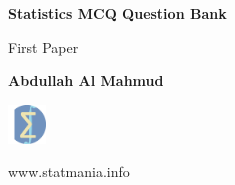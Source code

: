 \documentclass{exam}
\begin{document}
\begin{titlepage}
    \begin{center}
        \vspace*{1cm}
            
        \Huge
        \textbf{Statistics MCQ Question Bank}
            
        \vspace{0.5cm}
        \LARGE
        First Paper \\

            
        \vspace{1.5cm}
            
        \textbf{Abdullah Al Mahmud}
            
        \vfill
            
            
        \vspace{0.8cm}
        
             \includegraphics[width=1cm]{logo}
            
        \Large
        www.statmania.info\\
            
    \end{center}
\end{titlepage}
\end{document}
